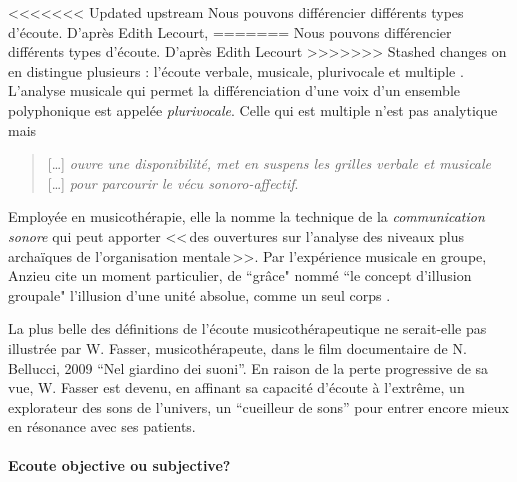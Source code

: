 <<<<<<< Updated upstream
Nous pouvons  différencier différents types d'écoute. 
D'après Edith Lecourt,
=======
Nous pouvons  différencier différents types d'écoute. D'après Edith Lecourt
>>>>>>> Stashed changes
on en distingue plusieurs : l'écoute verbale, musicale, plurivocale et multiple
\autocite[182]{lecourt:decouvrir}.
 L'analyse musicale qui permet la différenciation d'une voix d'un ensemble polyphonique est appelée \emph{plurivocale}. Celle qui est multiple n'est pas analytique  mais
 \begin{quote}
 	 [\ldots] \textit{ouvre une disponibilité, met en suspens les grilles verbale et musicale} [\ldots] \emph{pour parcourir le vécu sonoro-affectif}\autocite[183]{lecourt:decouvrir}.
 \end{quote}
 Employée en musicothérapie, elle la nomme la technique de la  \emph{communication sonore} qui peut apporter
 <<\,des ouvertures sur l'analyse des niveaux plus archaïques de l'organisation mentale\,>>\autocite[154]{lecourt:decouvrir}.
 Par l'expérience musicale en groupe, Anzieu cite un moment
 particulier, de ``grâce"  nommé ``le concept d'illusion groupale"
 l'illusion d'une unité absolue, comme un seul corps \autocite[113]{AnzieuMoiPeau}.

La plus belle des définitions de l'écoute musicothérapeutique ne serait-elle pas illustrée par W. 
Fasser, musicothérapeute,  dans le film documentaire de N. Bellucci, 2009 \enquote{Nel giardino dei 
suoni}.  
En raison de la perte progressive de sa vue, 
W. Fasser est devenu, en affinant sa capacité d'écoute à l'extrême, un explorateur des sons de l'univers,  
un 
 \enquote{cueilleur de sons} pour entrer encore mieux en résonance avec ses patients. 






\paragraph{Ecoute objective ou subjective?}

